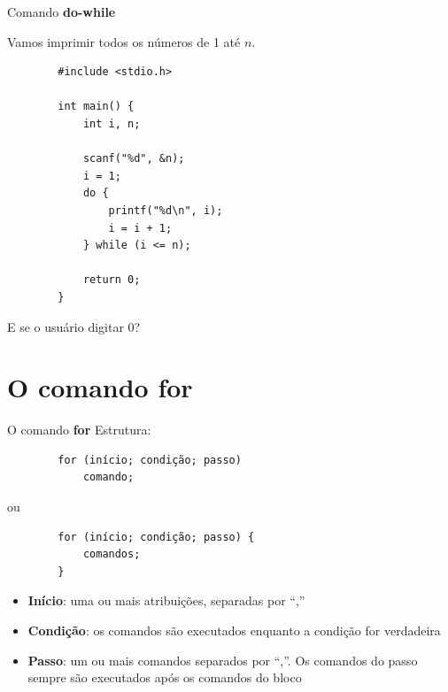 \documentclass[handout]{beamer}
\begin{document}
\begin{frame}[fragile]{Comando {\bf do-while}}

    Vamos imprimir todos os números de 1 até $n$.

    \begin{verbatim}
        #include <stdio.h>

        int main() {
            int i, n;

            scanf("%d", &n);
            i = 1;
            do {
                printf("%d\n", i);
                i = i + 1;
            } while (i <= n);

            return 0;
        }
    \end{verbatim}

    \pause
    E se o usuário digitar 0?
\end{frame}

\section{O comando {\bf for}}%

\begin{frame}[fragile]{O comando {\bf for}}
    \small
    Estrutura:
    \begin{verbatim}
        for (início; condição; passo)
            comando;
    \end{verbatim}
    \vskip -0.5cm
    ou
    \begin{verbatim}
        for (início; condição; passo) {
            comandos;
        }
    \end{verbatim}

    \begin{itemize}
        \item {\bf Início}: uma ou mais atribuições, separadas por ``,''
        \item {\bf Condição}: os comandos são executados enquanto a condição for verdadeira
        \item {\bf Passo}: um ou mais comandos separados por ``,''. Os comandos do passo sempre são executados após os comandos do bloco
    \end{itemize}
\end{frame}
\end{document}
